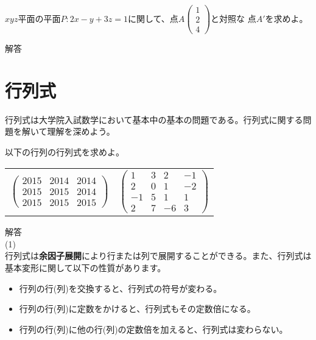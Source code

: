 \documentclass{jlreq}
\begin{document}
\begin{problem}
  $xyz$平面の平面$P: 2x - y + 3z = 1$に関して、点$A \begin{pmatrix} 1 \\ 2 \\ 4 \end{pmatrix}$と対照な
  点$A'$を求めよ。

  \dotfill
  解答 \\
\end{problem}

\section{行列式}
行列式は大学院入試数学において基本中の基本の問題である。行列式に関する問題を解いて理解を深めよう。
\begin{problem}
  以下の行列の行列式を求めよ。
  \begin{center}
    \begin{tabular}{cc}
      $\displaystyle
        \begin{pmatrix}
          2015 & 2014 & 2014 \\
          2015 & 2015 & 2014 \\
          2015 & 2015 & 2015
        \end{pmatrix}
      $
      & \hspace{2cm} %
      $\displaystyle
        \begin{pmatrix}
          1 & 3 & 2 & -1 \\
          2 & 0 & 1 & -2 \\
          -1 & 5 & 1 & 1 \\
          2 & 7 & -6 & 3
        \end{pmatrix}
      $
    \end{tabular}
  \end{center}
  \dotfill

  解答 \\
  (1) \\
  行列式は\textbf{余因子展開}により行または列で展開することができる。また、行列式は基本変形に関して以下の性質があります。

  \begin{itemize}
    \item 行列の行(列)を交換すると、行列式の符号が変わる。
    \item 行列の行(列)に定数をかけると、行列式もその定数倍になる。
    \item 行列の行(列)に他の行(列)の定数倍を加えると、行列式は変わらない。
  \end{itemize}


\end{problem}
\end{document}
